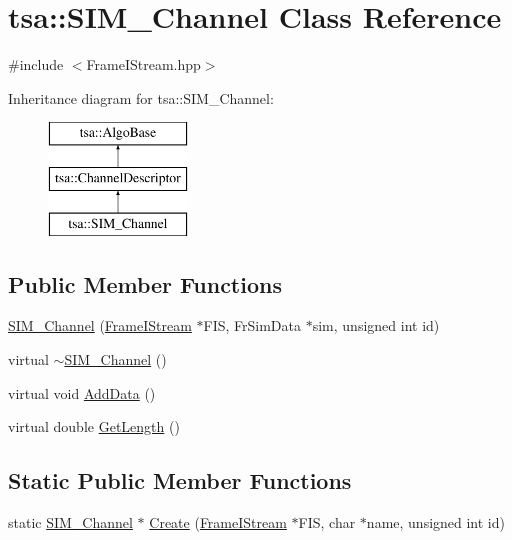 \hypertarget{classtsa_1_1_s_i_m___channel}{}\section{tsa\+:\+:S\+I\+M\+\_\+\+Channel Class Reference}
\label{classtsa_1_1_s_i_m___channel}


{\ttfamily \#include $<$Frame\+I\+Stream.\+hpp$>$}

Inheritance diagram for tsa\+:\+:S\+I\+M\+\_\+\+Channel\+:\begin{figure}[H]
\begin{center}
\leavevmode
\includegraphics[height=3.000000cm]{classtsa_1_1_s_i_m___channel}
\end{center}
\end{figure}
\subsection*{Public Member Functions}
\begin{DoxyCompactItemize}
\item 
\hyperlink{classtsa_1_1_s_i_m___channel_ae75272a802bff2d5164d405021c5f720}{S\+I\+M\+\_\+\+Channel} (\hyperlink{classtsa_1_1_frame_i_stream}{Frame\+I\+Stream} $\ast$F\+IS, Fr\+Sim\+Data $\ast$sim, unsigned int id)
\item 
virtual \hyperlink{classtsa_1_1_s_i_m___channel_a73d2a4e58efdc273a39486c35e7e1097}{$\sim$\+S\+I\+M\+\_\+\+Channel} ()
\item 
virtual void \hyperlink{classtsa_1_1_s_i_m___channel_ada133d83befff9b1bde7e13bb78df7e0}{Add\+Data} ()
\item 
virtual double \hyperlink{classtsa_1_1_s_i_m___channel_a99941fc8df0c8bbc32091e7e87d20de8}{Get\+Length} ()
\end{DoxyCompactItemize}
\subsection*{Static Public Member Functions}
\begin{DoxyCompactItemize}
\item 
static \hyperlink{classtsa_1_1_s_i_m___channel}{S\+I\+M\+\_\+\+Channel} $\ast$ \hyperlink{classtsa_1_1_s_i_m___channel_a5448e85710d2de326584711d01f27e72}{Create} (\hyperlink{classtsa_1_1_frame_i_stream}{Frame\+I\+Stream} $\ast$F\+IS, char $\ast$name, unsigned int id)
\end{DoxyCompactItemize}
